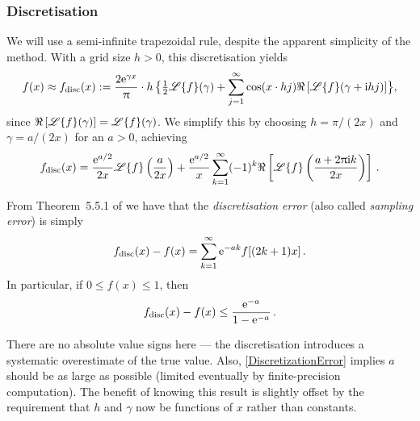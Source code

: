 \subsubsection{Discretisation} \label{Sub:Discretization}

We will use a semi-infinite trapezoidal rule, despite the apparent simplicity of the method.
With a grid size $h>0$, this discretisation yields
\[
f(x) \approx f_{\text{disc}}(x) := \frac{2\mathrm{e}^{\gamma x}}{\uppi} \cdot h \, \bigl \{ \tfrac12 \mathscr{L}\{f\}(\gamma) + \sum_{j=1}^\infty  \cos(x \cdot hj)\Re\left[\mathscr{L}\{f\}(\gamma + \mathrm{i} hj)\right] \bigr \},
\]
since  $\Re\left[\mathscr{L}\{f\}(\gamma)\right] = \mathscr{L}\{f\}(\gamma)$. We simplify this by choosing $h = \pi/(2 x)$ and $\gamma = a / (2 x)$ for an $a > 0$, achieving
\begin{equation} \label{DiscretizedInversion}
f_{\text{disc}}(x) = \frac{\mathrm{e}^{a/2}}{2x}\mathscr{L}\{f\} \left(\frac{a}{2 x}\right) + \frac{\mathrm{e}^{a/2}}{x} \sum_{k=1}^\infty (-1)^{k} \Re\left[\mathscr{L}\{f\}\left(\frac{a+ 2\uppi \mathrm{i} k}{2 x}\right)\right] \,.
\end{equation}

From Theorem~5.5.1 of \cite{RoScScTe08} we have that the \emph{discretisation error} (also called \emph{sampling error}) is simply
\begin{equation} \label{DiscretizationError}
    f_{\text{disc}}(x) - f(x) = \sum_{k=1}^\infty \mathrm{e}^{-a k} f[ (2k+1) x ] \,.
\end{equation}
In particular, if $0 \le f(x) \le 1$, then
\begin{equation} \label{BoundedDiscretizationError}
    f_{\text{disc}}(x) - f(x) \le \frac{\mathrm{e}^{-a}}{1-\mathrm{e}^{-a}} \,.
\end{equation}

There are no absolute value signs here --- the discretisation introduces a systematic overestimate of the true value.
Also, \eqref{DiscretizationError} implies $a$ should be as large as possible (limited eventually by finite-precision computation).
The benefit of knowing this result is slightly offset by the requirement that $h$ and $\gamma$ now be functions of $x$ rather than constants.

